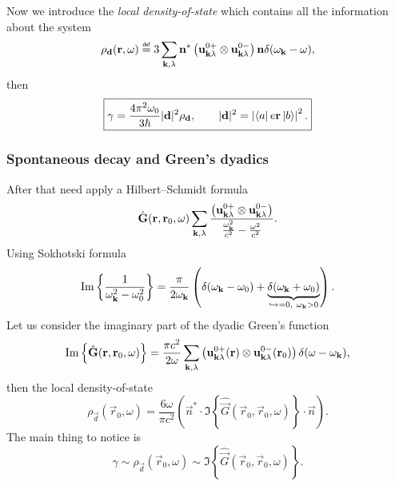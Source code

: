 Now we introduce the \textit{local density-of-state} which contains all the information about the system
\begin{equation}
	\rho_{\vec{d}} (\vec{r}, \omega) \myeq 3 \sum_{\kv, \lambda} \vec{n}^* \left( \vec{u}^{0+}_{\kv \lambda} \otimes \vec{u}^{0-}_{\kv \lambda} \right) \vec{n} \delta (\omega_{\kv} - \omega),
\end{equation}
then
\begin{equation}
	\boxed{	\gamma  = \frac{4 \pi^2 \omega_0}{3 \hbar} |\mathbf{d}|^2 \rho_{\mathbf{d}}, \qquad |\mathbf{d}|^2 = \left|  \left\langle {a} \right\rvert e \mathbf{r} \left\lvert {b} \right\rangle \right|^2. }
	\label{eq:gamma_start}
\end{equation}

\subsubsection{Spontaneous decay and Green's dyadics}

After that need apply a Hilbert–Schmidt formula 
\begin{equation}
	\hat{\mathbf{G}} (\mathbf{r}, \mathbf{r}_0, \omega) \sum_{\mathbf{k}, \lambda} \frac{\left( \mathbf{u}^{0+}_{\mathbf{k} \lambda} \otimes \mathbf{u}^{0-}_{\mathbf{k} \lambda} \right)}{\frac{\omega_{\mathbf{k}}^2}{c^2} - \frac{\omega^2}{c^2}}.
\end{equation}
Using Sokhotski formula
\begin{equation}
	\operatorname{Im} \left\{ \frac{1}{\omega_{\mathbf{k}}^2 - \omega_{0}^2} \right\} = \frac{\pi}{2 \omega_{\mathbf{k}}} \left( \delta(\omega_{\mathbf{k}} - \omega_{0}) + \underbrace{\delta(\omega_{\mathbf{k}} + \omega_{0})}_{\hookrightarrow=0,\ \omega_{\mathbf{k}}>0}\right).
\end{equation}
Let us consider the imaginary part of the dyadic Green's function
\begin{equation}
	\operatorname{Im} \left\{ \hat{\mathbf{G}}(\mathbf{r}, \mathbf{r}_0, \omega) \right\} = \frac{\pi c^2}{2 \omega} \sum_{\mathbf{k}, \lambda} \left( \mathbf{u}^{0+}_{\mathbf{k} \lambda} (\mathbf{r}) \otimes \mathbf{u}^{0-}_{\mathbf{k} \lambda} (\mathbf{r}_0) \right) \delta (\omega - \omega_{\mathbf{k}}),
\end{equation} 
then the local density-of-state
\begin{equation}
	\rho_{\vec{d}} (\vec{r}_0, \omega) = \frac{6 \omega}{\pi c^2} \left( \vec{n}^* \cdot \Im \left\{ \hat{\vec{G}} (\vec{r}_0, \vec{r}_0, \omega) \right\} \cdot \vec{n} \right).
\end{equation}
The main thing to notice is
\begin{equation}
	\boxed{	\gamma \sim \rho_{\vec{d}} (\vec{r}_0, \omega) \sim \Im \left\{ \hat{\vec{G}} (\vec{r}_0, \vec{r}_0, \omega) \right\}.}
\end{equation}

